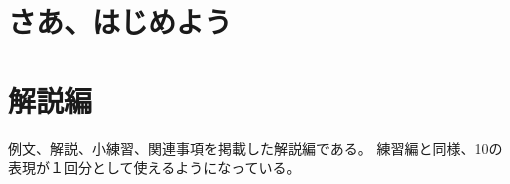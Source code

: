 \documentclass[
uplatex,
b5paper,
10pt,
dvipdfmx
]{jsbook}
\newif\ifEnglish
\begin{document}


\mainmatter

\ifEnglish
\chapter{Getting Started}
\else
\chapter{さあ、はじめよう}
\fi


\label{113010_11Dec18} %




\ifEnglish
\chapter{Commentary}

\else
\chapter{解説編}

\fi

例文、解説、小練習、関連事項を掲載した解説編である。
練習編と同様、10の表現が１回分として使えるようになっている。
\end{document}
